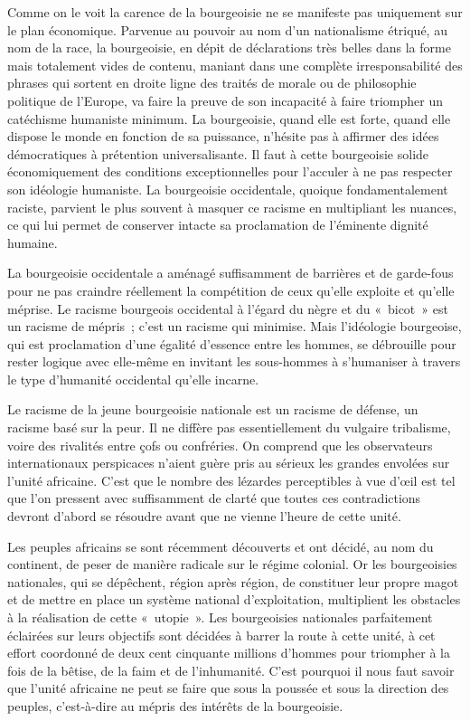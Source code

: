 \documentclass[french,twoside]{book} %
\begin{document}
\bigbreak
\noindent Comme on le voit la carence de la bourgeoisie ne se manifeste pas uniquement sur le plan économique. Parvenue au pouvoir au   nom d’un nationalisme étriqué, au nom de la race, la bourgeoisie, en dépit de déclarations très belles dans la forme mais totalement vides de contenu, maniant dans une complète irresponsabilité des phrases qui sortent en droite ligne des traités de morale ou de philosophie politique de l’Europe, va faire la preuve de son incapacité à faire triompher un catéchisme humaniste minimum. La bourgeoisie, quand elle est forte, quand elle dispose le monde en fonction de sa puissance, n’hésite pas à affirmer des idées démocratiques à prétention universalisante. Il faut à cette bourgeoisie solide économiquement des conditions exceptionnelles pour l’acculer à ne pas respecter son idéologie humaniste. La bourgeoisie occidentale, quoique fondamentalement raciste, parvient le plus souvent à masquer ce racisme en multipliant les nuances, ce qui lui permet de conserver intacte sa proclamation de l’éminente dignité humaine.\par
La bourgeoisie occidentale a aménagé suffisamment de barrières et de garde-fous pour ne pas craindre réellement la compétition de ceux qu’elle exploite et qu’elle méprise. Le racisme bourgeois occidental à l’égard du nègre et du « bicot » est un racisme de mépris ; c’est un racisme qui minimise. Mais l’idéologie bourgeoise, qui est proclamation d’une égalité d’essence entre les hommes, se débrouille pour rester logique avec elle-même en invitant les sous-hommes à s’humaniser à travers le type d’humanité occidental qu’elle incarne.\par
Le racisme de la jeune bourgeoisie nationale est un racisme de défense, un racisme basé sur la peur. Il ne diffère pas essentiellement du vulgaire tribalisme, voire des rivalités entre çofs ou confréries. On comprend que les observateurs internationaux perspicaces n’aient guère pris au sérieux les grandes envolées sur l’unité africaine. C’est que le nombre des lézardes perceptibles à vue d’œil est tel que l’on pressent avec suffisamment de clarté que toutes ces contradictions devront d’abord se résoudre avant que ne vienne l’heure de cette unité.\par
Les peuples africains se sont récemment découverts et ont décidé, au nom du continent, de peser de manière radicale sur le régime colonial. Or les bourgeoisies nationales, qui se dépêchent,   région après région, de constituer leur propre magot et de mettre en place un système national d’exploitation, multiplient les obstacles à la réalisation de cette « utopie ». Les bourgeoisies nationales parfaitement éclairées sur leurs objectifs sont décidées à barrer la route à cette unité, à cet effort coordonné de deux cent cinquante millions d’hommes pour triompher à la fois de la bêtise, de la faim et de l’inhumanité. C’est pourquoi il nous faut savoir que l’unité africaine ne peut se faire que sous la poussée et sous la direction des peuples, c’est-à-dire au mépris des intérêts de la bourgeoisie.\par
\end{document}
